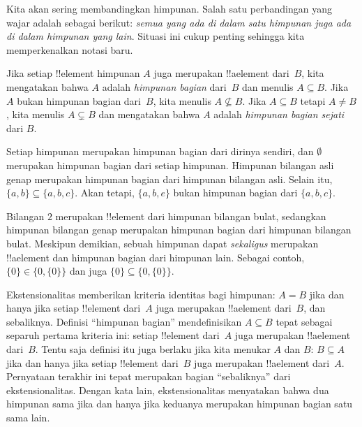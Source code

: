 \documentclass[../../../include/open-logic-section]{subfiles}
\begin{document}

\begin{explain}
Kita akan sering membandingkan himpunan. Salah satu perbandingan yang
wajar adalah sebagai berikut: \emph{semua yang ada di dalam satu
himpunan juga ada di dalam himpunan yang lain}. Situasi ini cukup
penting sehingga kita memperkenalkan notasi baru.
\end{explain}

\begin{defn}
Jika setiap !!{element} himpunan $A$ juga merupakan !!a{element}
dari~$B$, kita mengatakan bahwa $A$ adalah \emph{himpunan bagian}
dari~$B$ dan menulis $A \subseteq B$. Jika $A$ bukan himpunan bagian
dari~$B$, kita menulis $A \not\subseteq B$. Jika $A \subseteq B$
tetapi $A \neq B$, kita menulis $A \subsetneq B$ dan mengatakan bahwa
$A$ adalah \emph{himpunan bagian sejati} dari $B$.
\end{defn}

\begin{ex}
Setiap himpunan merupakan himpunan bagian dari dirinya sendiri, dan
$\emptyset$ merupakan himpunan bagian dari setiap himpunan. Himpunan
bilangan asli genap merupakan himpunan bagian dari himpunan bilangan
asli. Selain itu, $\{ a, b \} \subseteq \{ a, b, c \}$. Akan tetapi,
$\{ a, b, e \}$ bukan himpunan bagian dari $\{ a, b, c \}$.
\end{ex}

\begin{ex}
Bilangan $2$ merupakan !!{element} dari himpunan bilangan bulat,
sedangkan himpunan bilangan genap merupakan himpunan bagian dari
himpunan bilangan bulat. Meskipun demikian, sebuah himpunan dapat
\emph{sekaligus} merupakan !!a{element} dan himpunan bagian dari
himpunan lain. Sebagai contoh, $\{0\} \in \{0, \{0\}\}$ dan juga
$\{0\} \subseteq \{0, \{0\}\}$.
\end{ex}

Ekstensionalitas memberikan kriteria identitas bagi himpunan: $A = B$
jika dan hanya jika setiap !!{element} dari~$A$ juga merupakan
!!a{element} dari~$B$, dan sebaliknya. Definisi ``himpunan bagian''
mendefinisikan $A \subseteq B$ tepat sebagai separuh pertama kriteria
ini: setiap !!{element} dari~$A$ juga merupakan !!a{element} dari~$B$.
Tentu saja definisi itu juga berlaku jika kita menukar $A$ dan $B$:
$B \subseteq A$ jika dan hanya jika setiap !!{element} dari~$B$ juga
merupakan !!a{element} dari~$A$. Pernyataan terakhir ini tepat
merupakan bagian ``sebaliknya'' dari ekstensionalitas. Dengan kata
lain, ekstensionalitas menyatakan bahwa dua himpunan sama jika dan
hanya jika keduanya merupakan himpunan bagian satu sama lain.
\end{document}
